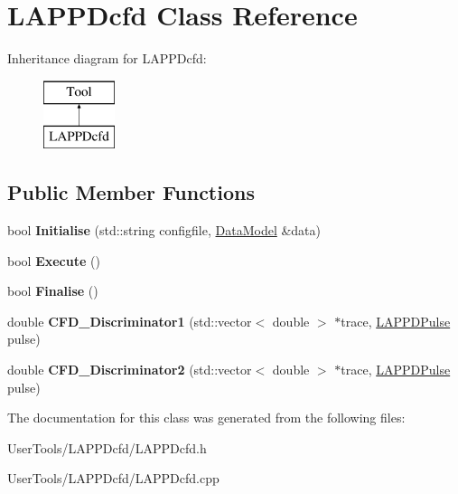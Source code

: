 \hypertarget{classLAPPDcfd}{\section{L\-A\-P\-P\-Dcfd Class Reference}
\label{classLAPPDcfd}
}
Inheritance diagram for L\-A\-P\-P\-Dcfd\-:\begin{figure}[H]
\begin{center}
\leavevmode
\includegraphics[height=2.000000cm]{classLAPPDcfd}
\end{center}
\end{figure}
\subsection*{Public Member Functions}
\begin{DoxyCompactItemize}
\item 
\hypertarget{classLAPPDcfd_a712d671041c6dd069c060ad9eee43b5f}{bool {\bfseries Initialise} (std\-::string configfile, \hyperlink{classDataModel}{Data\-Model} \&data)}\label{classLAPPDcfd_a712d671041c6dd069c060ad9eee43b5f}

\item 
\hypertarget{classLAPPDcfd_a7776cd36991d9ccd6ed510c58b83f765}{bool {\bfseries Execute} ()}\label{classLAPPDcfd_a7776cd36991d9ccd6ed510c58b83f765}

\item 
\hypertarget{classLAPPDcfd_a9506c223f4626d40539efd132fc21acc}{bool {\bfseries Finalise} ()}\label{classLAPPDcfd_a9506c223f4626d40539efd132fc21acc}

\item 
\hypertarget{classLAPPDcfd_a81ca5d4bda97c4e0aeb8440af918a799}{double {\bfseries C\-F\-D\-\_\-\-Discriminator1} (std\-::vector$<$ double $>$ $\ast$trace, \hyperlink{classLAPPDPulse}{L\-A\-P\-P\-D\-Pulse} pulse)}\label{classLAPPDcfd_a81ca5d4bda97c4e0aeb8440af918a799}

\item 
\hypertarget{classLAPPDcfd_a6473bfb16d498aa3ac23b566fe2a4d89}{double {\bfseries C\-F\-D\-\_\-\-Discriminator2} (std\-::vector$<$ double $>$ $\ast$trace, \hyperlink{classLAPPDPulse}{L\-A\-P\-P\-D\-Pulse} pulse)}\label{classLAPPDcfd_a6473bfb16d498aa3ac23b566fe2a4d89}

\end{DoxyCompactItemize}


The documentation for this class was generated from the following files\-:\begin{DoxyCompactItemize}
\item 
User\-Tools/\-L\-A\-P\-P\-Dcfd/L\-A\-P\-P\-Dcfd.\-h\item 
User\-Tools/\-L\-A\-P\-P\-Dcfd/L\-A\-P\-P\-Dcfd.\-cpp\end{DoxyCompactItemize}
